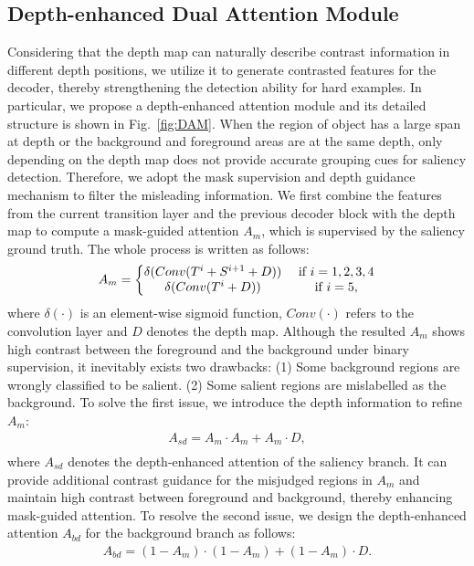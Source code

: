 \documentclass[runningheads]{llncs}
\begin{document}
\subsection{Depth-enhanced Dual Attention Module}\label{sec:DAM}
Considering that the depth map can naturally describe contrast information in different depth positions, we utilize it to generate contrasted features for the decoder, thereby strengthening the detection ability for hard examples. In particular, we propose a depth-enhanced attention module and its detailed structure is shown in Fig.~\ref{fig:DAM}.
When the region of object has a large span at depth or the background and foreground areas are at the same depth, only depending on the depth map does not provide accurate grouping cues for saliency detection. Therefore, we adopt the mask supervision and depth guidance mechanism to filter the misleading information. 
We first combine the features from the current transition layer and the previous decoder block with the depth map to compute a mask-guided attention $A_{m}$, which is supervised by the saliency ground truth. The whole process is written as follows:
\begin{equation}\label{equ:1}
\centering
    A_{m}
    = \left\{\begin{matrix}
    \delta(Conv(T^{i}+S^{i+1}+D)) & \text{ if } i=1, 2, 3, 4\\
    \delta(Conv(T^{i}+D)) & \text{ if } i=5,
    \end{matrix}\right.
\end{equation}
where $\delta(\cdot)$ is an element-wise sigmoid function, $Conv(\cdot)$ refers to the convolution layer and $D$ denotes the depth map.  
Although the resulted $A_{m}$ shows high contrast between the foreground and the background under binary supervision, it inevitably exists two drawbacks: (1) Some background regions are wrongly classified to be salient. (2) Some salient regions are mislabelled as the background.
To solve the first issue, we introduce the depth information to refine $A_{m}$:
\begin{equation}\label{equ:2}
\begin{split}
A_{sd} = A_{m} \cdot A_{m}+ A_{m}\cdot D, \\
\end{split} 
\end{equation}
where $A_{sd}$ denotes the depth-enhanced attention of the saliency branch. 
It can provide additional contrast guidance for the misjudged regions in $A_{m}$ and maintain high contrast between foreground and background, thereby enhancing mask-guided attention.
To resolve the second issue, we design the depth-enhanced attention $A_{bd}$ for the background branch as follows:
\begin{equation}\label{equ:3}
\begin{split}
A_{bd} = (1-A_{m}) \cdot (1- A_{m})+(1- A_{m}) \cdot D.
\end{split} 
\end{equation}
\end{document}
